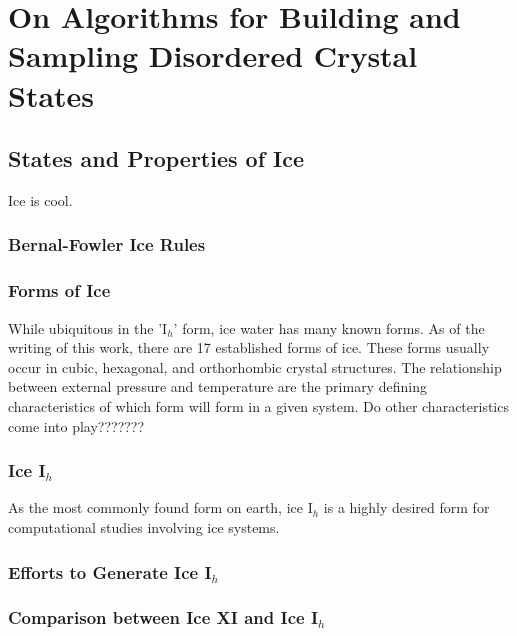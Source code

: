 \chapter{On Algorithms for Building and Sampling Disordered Crystal States}
\label{ch:iceXI}


\section{States and Properties of Ice}

Ice is cool. 


\subsection{Bernal-Fowler Ice Rules}



\subsection{Forms of Ice}

While ubiquitous in the 'I$_{h}$' form, ice water has many known forms.
As of the writing of this work, there are 17 established forms of ice. 
These forms usually occur in cubic, hexagonal, and orthorhombic crystal structures.
The relationship between external pressure and temperature are the primary defining characteristics of which form will form in a given system. 
Do other characteristics come into play??????? %


\subsection{Ice I$_{h}$}

As the most commonly found form on earth, ice I$_{h}$ is a highly desired form for computational studies involving ice systems. 


\subsection{Efforts to Generate Ice I$_{h}$}

\subsection{Comparison between Ice XI and Ice I$_{h}$}

